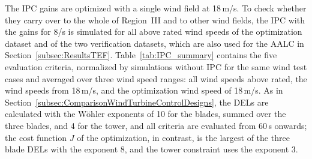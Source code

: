 
The IPC gains are optimized with a single wind field at 18\,m/s. To check whether they carry over to the whole of Region~III and to other wind fields, the IPC with the gains for 8\textdegree/s is simulated for all above rated wind speeds of the optimization dataset and of the two verification datasets, which are also used for the AALC in Section~\ref{subsec:ResultsTEF}. Table~\ref{tab:IPC_summary} contains the five evaluation criteria, normalized by simulations without IPC for the same wind test cases and averaged over three wind speed ranges: all wind speeds above rated, the wind speeds from 18\,m/s, and the optimization wind speed of 18\,m/s. As in Section~\ref{subsec:ComparisonWindTurbineControlDesigns}, the DELs are calculated with the W\"ohler exponents of 10 for the blades, summed over the three blades, and 4 for the tower, and all criteria are evaluated from 60\,s onwards; the cost function $J$ of the optimization, in contrast, is the largest of the three blade DELs with the exponent 8, and the tower constraint uses the exponent 3.

